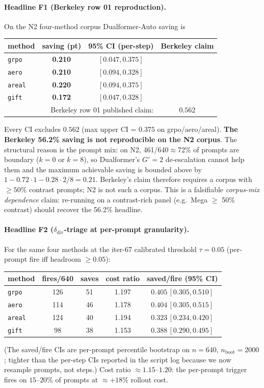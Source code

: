 \documentclass{article}
\begin{document}
\paragraph{Headline F1 (Berkeley row 01 reproduction).}
On the N2 four-method corpus Dualformer-Auto saving is
\begin{center}
\begin{tabular}{lccc}
\toprule
method & saving (pt) & 95\% CI (per-step) & Berkeley claim \\
\midrule
\texttt{grpo}  & \textbf{0.210} & $[0.047, 0.375]$ &  \\
\texttt{aero}  & \textbf{0.210} & $[0.094, 0.328]$ &  \\
\texttt{areal} & \textbf{0.220} & $[0.094, 0.375]$ &  \\
\texttt{gift}  & \textbf{0.172} & $[0.047, 0.328]$ &  \\
\midrule
\multicolumn{3}{r}{Berkeley row 01 published claim:} & $0.562$ \\
\bottomrule
\end{tabular}
\end{center}
Every CI excludes $0.562$ (max upper CI = $0.375$ on grpo/aero/areal).
\textbf{The Berkeley 56.2\% saving is not reproducible on the N2 corpus}.
The structural reason is the prompt mix: on N2, 461/640$\approx$72\%
of prompts are boundary ($k{=}0$ or $k{=}8$), so Dualformer's
$G'{=}2$ de-escalation cannot help them and the maximum achievable
saving is bounded above by $1 - 0.72 \cdot 1 - 0.28 \cdot 2/8 = 0.21$.
Berkeley's claim therefore requires a corpus with $\geq 50\%$
contrast prompts; N2 is not such a corpus. This is a falsifiable
\emph{corpus-mix dependence} claim: re-running on a contrast-rich
panel (e.g.\ Mega $\geq$ 50\% contrast) should recover the 56.2\%
headline.

\paragraph{Headline F2 ($\delta_{\mathrm{div}}$-triage at per-prompt granularity).}
For the same four methods at the iter-67 calibrated threshold
$\tau{=}0.05$ (per-prompt fire iff headroom $\geq 0.05$):
\begin{center}
\begin{tabular}{lcccc}
\toprule
method & fires/640 & saves & cost ratio & saved/fire (95\% CI) \\
\midrule
\texttt{grpo}  & 126 & 51 & 1.197 & $0.405\,[0.305,0.510]$ \\
\texttt{aero}  & 114 & 46 & 1.178 & $0.404\,[0.305,0.515]$ \\
\texttt{areal} & 124 & 40 & 1.194 & $0.323\,[0.234,0.420]$ \\
\texttt{gift}  &  98 & 38 & 1.153 & $0.388\,[0.290,0.495]$ \\
\bottomrule
\end{tabular}
\end{center}
(The saved/fire CIs are per-prompt percentile bootstrap on $n{=}640$,
$n_{\mathrm{boot}}{=}2000$; tighter than the per-step CIs reported in
the script log because we now resample prompts, not steps.)  Cost
ratio $\approx 1.15$--$1.20$: the per-prompt trigger fires on $15$--$20\%$
of prompts at $\approx +18\%$ rollout cost.
\end{document}
